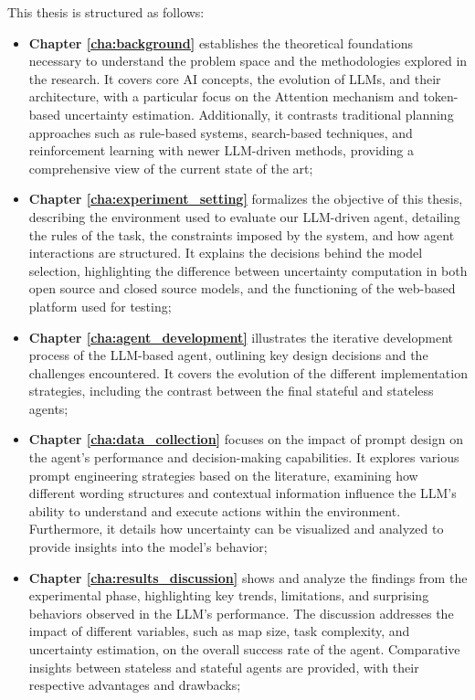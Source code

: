 This thesis is structured as follows:
\begin{itemize}
  \item \textbf{Chapter \ref{cha:background}} establishes the theoretical
    foundations necessary to understand the problem space and the methodologies
    explored in the research. It covers core AI concepts, the evolution of LLMs,
    and their architecture, with a particular focus on the Attention mechanism
    and token-based uncertainty estimation. Additionally, it contrasts
    traditional planning approaches such as rule-based systems, search-based techniques,
    and reinforcement learning with newer LLM-driven methods, providing a comprehensive
    view of the current state of the art;

  \item \textbf{Chapter \ref{cha:experiment_setting}} formalizes the objective
    of this thesis, describing the environment used to evaluate our LLM-driven agent,
    detailing the rules of the task, the constraints imposed by the system, and
    how agent interactions are structured. It explains the decisions behind the model
    selection, highlighting the difference between uncertainty computation in
    both open source and closed source models, and the functioning of the web-based
    platform used for testing;

  \item \textbf{Chapter \ref{cha:agent_development}} illustrates the iterative
    development process of the LLM-based agent, outlining key design decisions and
    the challenges encountered. It covers the evolution of the different
    implementation strategies, including the contrast between the final stateful
    and stateless agents;

  \item \textbf{Chapter \ref{cha:data_collection}} focuses on the impact of
    prompt design on the agent's performance and decision-making capabilities. It
    explores various prompt engineering strategies based on the literature,
    examining how different wording structures and contextual information
    influence the LLM's ability to understand and execute actions within the
    environment. Furthermore, it details how uncertainty can be visualized and
    analyzed to provide insights into the model's behavior;

  \item \textbf{Chapter \ref{cha:results_discussion}} shows and analyze the
    findings from the experimental phase, highlighting key trends, limitations, and
    surprising behaviors observed in the LLM's performance. The discussion
    addresses the impact of different variables, such as map size, task
    complexity, and uncertainty estimation, on the overall success rate of the
    agent. Comparative insights between stateless and stateful agents are provided,
    with their respective advantages and drawbacks;


\end{itemize}
